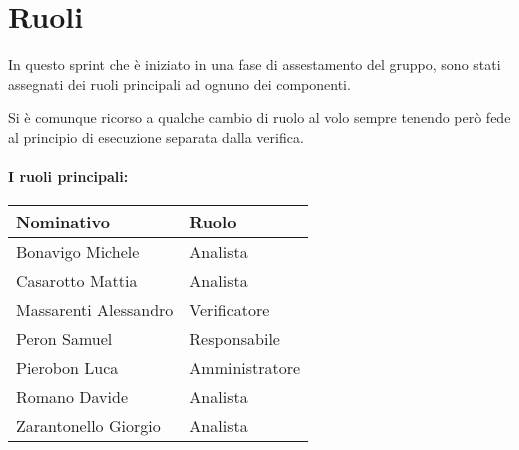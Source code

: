 \section{Ruoli}

In questo sprint che è iniziato in una fase di assestamento del gruppo, sono stati assegnati dei ruoli principali ad ognuno dei componenti.

Si è comunque ricorso a qualche cambio di ruolo al volo sempre tenendo però fede al principio di esecuzione separata dalla verifica.

\paragraph{I ruoli principali:}

\begin{center}
    \begin{tabularx}{\textwidth}{X l}
        
        \rowcolor{gray!30} \textbf{Nominativo} & \textbf{Ruolo}\\
        
        \hline

        Bonavigo Michele & Analista \\
        \rowcolor{gray!10}Casarotto Mattia & Analista \\
        Massarenti Alessandro & Verificatore \\
        \rowcolor{gray!10}Peron Samuel & Responsabile \\
        Pierobon Luca & Amministratore \\
        \rowcolor{gray!10}Romano Davide & Analista \\
        Zarantonello Giorgio & Analista \\

    \end{tabularx}
\end{center}
